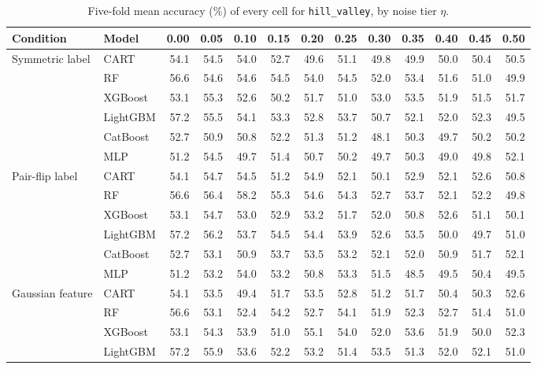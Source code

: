 \begin{table}[p]
\centering
\tiny
\setlength{\tabcolsep}{2.6pt}
\caption{Five-fold mean accuracy (\%) of every cell for \texttt{hill\_valley}, by noise tier $\eta$.}
\label{tab:grid_hill_valley}
\begin{tabular}{@{}llrrrrrrrrrrr@{}}
\toprule
Condition & Model & 0.00 & 0.05 & 0.10 & 0.15 & 0.20 & 0.25 & 0.30 & 0.35 & 0.40 & 0.45 & 0.50 \\
\midrule
Symmetric label & CART & 54.1 & 54.5 & 54.0 & 52.7 & 49.6 & 51.1 & 49.8 & 49.9 & 50.0 & 50.4 & 50.5 \\
 & RF & 56.6 & 54.6 & 54.6 & 54.5 & 54.0 & 54.5 & 52.0 & 53.4 & 51.6 & 51.0 & 49.9 \\
 & XGBoost & 53.1 & 55.3 & 52.6 & 50.2 & 51.7 & 51.0 & 53.0 & 53.5 & 51.9 & 51.5 & 51.7 \\
 & LightGBM & 57.2 & 55.5 & 54.1 & 53.3 & 52.8 & 53.7 & 50.7 & 52.1 & 52.0 & 52.3 & 49.5 \\
 & CatBoost & 52.7 & 50.9 & 50.8 & 52.2 & 51.3 & 51.2 & 48.1 & 50.3 & 49.7 & 50.2 & 50.2 \\
 & MLP & 51.2 & 54.5 & 49.7 & 51.4 & 50.7 & 50.2 & 49.7 & 50.3 & 49.0 & 49.8 & 52.1 \\
\midrule
Pair-flip label & CART & 54.1 & 54.7 & 54.5 & 51.2 & 54.9 & 52.1 & 50.1 & 52.9 & 52.1 & 52.6 & 50.8 \\
 & RF & 56.6 & 56.4 & 58.2 & 55.3 & 54.6 & 54.3 & 52.7 & 53.7 & 52.1 & 52.2 & 49.8 \\
 & XGBoost & 53.1 & 54.7 & 53.0 & 52.9 & 53.2 & 51.7 & 52.0 & 50.8 & 52.6 & 51.1 & 50.1 \\
 & LightGBM & 57.2 & 56.2 & 53.7 & 54.5 & 54.4 & 53.9 & 52.6 & 53.5 & 50.0 & 49.7 & 51.0 \\
 & CatBoost & 52.7 & 53.1 & 50.9 & 53.7 & 53.5 & 53.2 & 52.1 & 52.0 & 50.9 & 51.7 & 52.1 \\
 & MLP & 51.2 & 53.2 & 54.0 & 53.2 & 50.8 & 53.3 & 51.5 & 48.5 & 49.5 & 50.4 & 49.5 \\
\midrule
Gaussian feature & CART & 54.1 & 53.5 & 49.4 & 51.7 & 53.5 & 52.8 & 51.2 & 51.7 & 50.4 & 50.3 & 52.6 \\
 & RF & 56.6 & 53.1 & 52.4 & 54.2 & 52.7 & 54.1 & 51.9 & 52.3 & 52.7 & 51.4 & 51.0 \\
 & XGBoost & 53.1 & 54.3 & 53.9 & 51.0 & 55.1 & 54.0 & 52.0 & 53.6 & 51.9 & 50.0 & 52.3 \\
 & LightGBM & 57.2 & 55.9 & 53.6 & 52.2 & 53.2 & 51.4 & 53.5 & 51.3 & 52.0 & 52.1 & 51.0 \\

\end{tabular}
\end{table}
